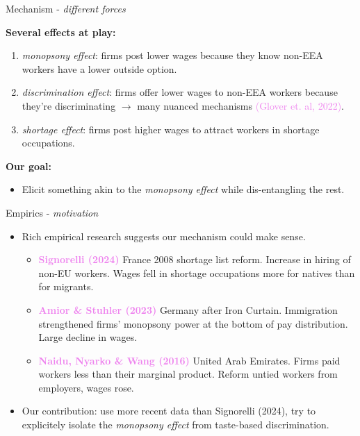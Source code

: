 \documentclass[aspectratio=169,10pt,xcolor={dvipsnames}]{beamer}
\begin{document}
\begin{frame}{Mechanism - \textit{different forces}}

	\alert{\textbf{Several effects at play:}}
	\vspace{0.2cm}
	\begin{enumerate}
		\item \alert{\textit{monopsony effect}}: firms post lower wages because they know non-EEA workers have a lower outside option.
		\vspace{0.1cm}
		\item \alert{\textit{discrimination effect}}: firms offer lower wages to non-EEA workers because they're discriminating $\rightarrow$ many nuanced mechanisms \textcolor{violet}{(Glover et. al, 2022)}.
		\vspace{0.1cm}
		\item \alert{\textit{shortage effect}}: firms post higher wages to attract workers in shortage occupations.
		\vspace{0.1cm}
		
	\end{enumerate}

	\vspace{0.4cm}
	\alert{\textbf{Our goal:}}
	\begin{itemize}
		\item Elicit something akin to the \alert{\textit{monopsony effect}} while dis-entangling the rest. 
	\end{itemize}
 \end{frame}



\begin{frame}{Empirics - \textit{motivation}}
    \begin{itemize}
	\item Rich empirical research suggests our mechanism could make sense. 
	\vspace{0.3cm} 
	
	\begin{itemize}
	\item \textcolor{violet}{\textbf{Signorelli (2024)}} France 2008 shortage list reform. Increase in hiring of non-EU workers. Wages fell in shortage occupations more for natives than for migrants. 
	\vspace{0.2cm}
	\item \textcolor{violet}{\textbf{Amior \& Stuhler (2023)}} Germany after Iron Curtain. Immigration strengthened firms' monopsony power at the bottom of pay distribution. Large decline in wages.
	\vspace{0.2cm}
	\item \textcolor{violet}{\textbf{Naidu, Nyarko \& Wang (2016)}} United Arab Emirates. Firms paid workers less than their marginal product. Reform untied workers from employers, wages rose.
	\end{itemize}

	\vspace{0.3cm}
	\item \alert{Our contribution:} use more recent data than Signorelli (2024), try to explicitely isolate the \alert{\textit{monopsony effect}} from taste-based discrimination. 
\end{itemize}
\end{frame}
\end{document}
